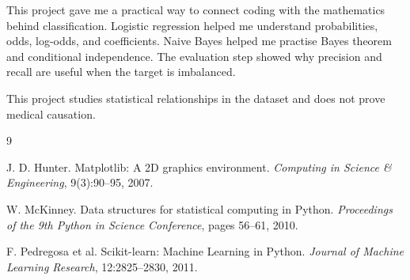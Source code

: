 \documentclass[11pt]{article}
\begin{document}
This project gave me a practical way to connect coding with the mathematics behind classification. Logistic regression helped me understand probabilities, odds, log-odds, and coefficients. Naive Bayes helped me practise Bayes theorem and conditional independence. The evaluation step showed why precision and recall are useful when the target is imbalanced.

This project studies statistical relationships in the dataset and does not prove medical causation.

\begin{thebibliography}{9}

J. D. Hunter.
Matplotlib: A 2D graphics environment.
\textit{Computing in Science \& Engineering}, 9(3):90--95, 2007.

W. McKinney.
Data structures for statistical computing in Python.
\textit{Proceedings of the 9th Python in Science Conference}, pages 56--61, 2010.

F. Pedregosa et al.
Scikit-learn: Machine Learning in Python.
\textit{Journal of Machine Learning Research}, 12:2825--2830, 2011.

\end{thebibliography}
\end{document}
